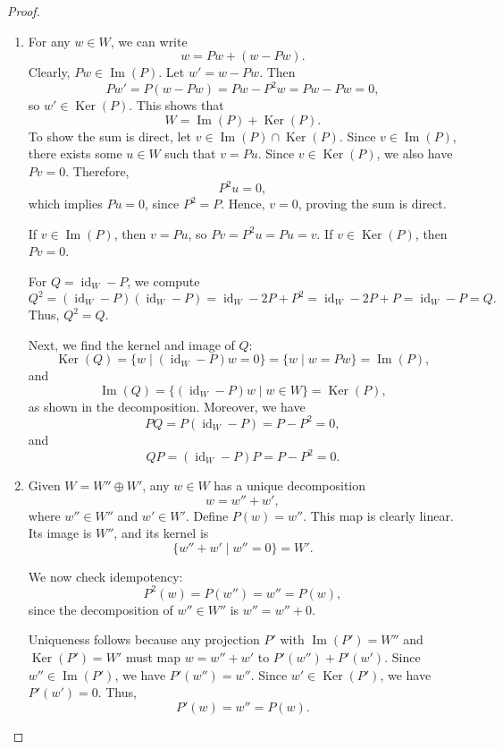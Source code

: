 \begin{proof}\, 
    \begin{enumerate}
    \item For any $w \in W$, we can write
    \[
    w = Pw + (w - Pw).
    \]
    Clearly, $Pw \in \operatorname{Im}(P)$. Let $w' = w - Pw$. Then
    \[
    Pw' = P(w - Pw) = Pw - P^2w = Pw - Pw = 0,
    \]
    so $w' \in \operatorname{Ker}(P)$. This shows that
    \[
    W = \operatorname{Im}(P) + \operatorname{Ker}(P).
    \]
    To show the sum is direct, let $v \in \operatorname{Im}(P) \cap \operatorname{Ker}(P)$. Since $v \in \operatorname{Im}(P)$, there exists some $u \in W$ such that $v = Pu$. Since $v \in \operatorname{Ker}(P)$, we also have $Pv = 0$. Therefore,
    \[
    P^2u = 0,
    \]
    which implies $Pu = 0$, since $P^2 = P$. Hence, $v = 0$, proving the sum is direct.
    
    If $v \in \operatorname{Im}(P)$, then $v = Pu$, so $Pv = P^2u = Pu = v$. If $v \in \operatorname{Ker}(P)$, then $Pv = 0$.
    
    For $Q = \operatorname{id}_W - P$, we compute
    \[
    Q^2 = (\operatorname{id}_W - P)(\operatorname{id}_W - P) = \operatorname{id}_W - 2P + P^2 = \operatorname{id}_W - 2P + P = \operatorname{id}_W - P = Q.
    \]
    Thus, $Q^2 = Q$.
    
    Next, we find the kernel and image of $Q$:
    \[
    \operatorname{Ker}(Q) = \{w \mid (\operatorname{id}_W - P)w = 0\} = \{w \mid w = Pw\} = \operatorname{Im}(P),
    \]
    and
    \[
    \operatorname{Im}(Q) = \{(\operatorname{id}_W - P)w \mid w \in W\} = \operatorname{Ker}(P),
    \]
    as shown in the decomposition. Moreover, we have
    \[
    PQ = P(\operatorname{id}_W - P) = P - P^2 = 0,
    \]
    and
    \[
    QP = (\operatorname{id}_W - P)P = P - P^2 = 0.
    \]
    
    \item Given $W = W'' \oplus W'$, any $w \in W$ has a unique decomposition
    \[
    w = w'' + w',
    \]
    where $w'' \in W''$ and $w' \in W'$. Define $P(w) = w''$. This map is clearly linear. Its image is $W''$, and its kernel is
    \[
    \{w'' + w' \mid w'' = 0\} = W'.
    \]
    
    We now check idempotency:
    \[
    P^2(w) = P(w'') = w'' = P(w),
    \]
    since the decomposition of $w'' \in W''$ is $w'' = w'' + 0$.
    
    Uniqueness follows because any projection $P'$ with $\operatorname{Im}(P') = W''$ and $\operatorname{Ker}(P') = W'$ must map $w = w'' + w'$ to $P'(w'') + P'(w')$. Since $w'' \in \operatorname{Im}(P')$, we have $P'(w'') = w''$. Since $w' \in \operatorname{Ker}(P')$, we have $P'(w') = 0$. Thus,
    \[
    P'(w) = w'' = P(w).
    \]
\end{enumerate}
\end{proof}

